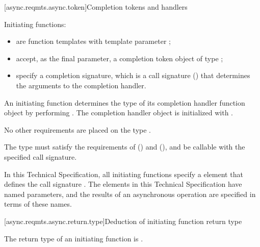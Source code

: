 [async.reqmts.async.token]{Completion tokens and handlers}

%
\pnum
Initiating functions:

\begin{itemize}
\item
are function templates with template parameter ;

%
\item
accept, as the final parameter, a completion token object  of type ;

%
\item
specify a completion signature, which is a call signature ()  that determines the arguments to the completion handler.
\end{itemize}

%
\pnum
An initiating function determines the type  of its
completion handler function object by performing
.
The completion handler object  is initialized with
.
\begin{note} No other requirements are placed on the type . \end{note}

\pnum
The type  must satisfy the requirements of  () and  (), and be callable with the specified call signature.

\pnum
In this Technical Specification, all initiating functions specify a
\completionsig element that defines the call signature .
The \completionsig elements in this Technical Specification have named
parameters, and the results of an asynchronous operation are specified in
terms of these names.



[async.reqmts.async.return.type]{Deduction of initiating function return type}

%
\pnum
The return type of an initiating function is .

